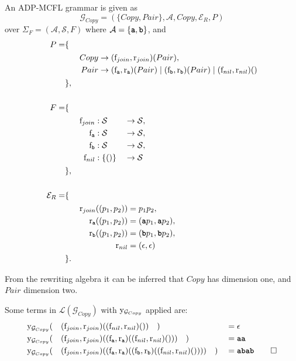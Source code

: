\documentclass[
    a4paper,
    12pt,
    twoside,
    BCOR=12mm,
    parskip=half,
    chapterprefix,
    numbers=noenddot,
    bibliography=totoc
]{scrbook}
\begin{document}
\begin{example}
	\label{ex:adp_mcfl_copylang}
	An ADP-MCFL grammar is given as
	\[ \mathcal{G}_{Copy} = (\{Copy,Pair\},\mathcal{A},Copy,\mathcal{E}_{R},P) \] over $\Sigma_{F}=(\mathcal{A},\mathcal{S},F)$ where $\mathcal{A}=\{\ts{a},\ts{b}\}$, and
	\begin{align*}
		P = &\{&&\\
			&&&\begin{aligned}
          Copy &\to (\op{f}_{join},\op{r}_{join})(Pair), \\
          Pair &\to (\op{f}_\ts{a},\op{r}_\ts{a})(Pair) \mid (\op{f}_\ts{b},\op{r}_\ts{b})(Pair) \mid (\op{f}_{nil},\op{r}_{nil})()
        \end{aligned}\\
		&\},&&\\
    \\
		F = &\{&&\\
		&&&\begin{aligned}
        \op{f}_{join} &: \mathcal{S} &&\to \mathcal{S},\\
        \op{f}_\ts{a} &: \mathcal{S} &&\to \mathcal{S},\\
        \op{f}_\ts{b} &: \mathcal{S} &&\to \mathcal{S},\\
        \op{f}_{nil} &: \{()\} &&\to \mathcal{S}
      \end{aligned}\\
		&\},&&\\
    \\
		\mathcal{E}_{R} = &\{&&\\
		&&&\begin{aligned}
        \op{r}_{join}((p_1,p_2)) &= p_1 p_2,\\
        \op{r}_\ts{a}((p_1,p_2)) &= (\ts{a} p_1, \ts{a} p_2),\\
        \op{r}_\ts{b}((p_1,p_2)) &= (\ts{b} p_1, \ts{b} p_2),\\
        \op{r}_{nil} &= (\epsilon,\epsilon)
      \end{aligned}\\
		&\}.&&
	\end{align*}
	
	From the rewriting algebra it can be inferred that $Copy$ has dimension one, and $Pair$ dimension two.
	
	Some terms in $\mathcal{L}(\mathcal{G}_{Copy})$ with $\mathrm{y}_{\mathcal{G}_{Copy}}$ applied are:
	\begin{align*}
		&\op{y}_{\mathcal{G}_{Copy}}(\quad (\op{f}_{join},\op{r}_{join})((\op{f}_{nil},\op{r}_{nil})()) \quad) &&= \epsilon\\
		&\op{y}_{\mathcal{G}_{Copy}}(\quad (\op{f}_{join},\op{r}_{join})((\op{f}_\ts{a},\op{r}_\ts{a})((\op{f}_{nil},\op{r}_{nil})())) \quad) &&= \ts{aa}\\
		&\op{y}_{\mathcal{G}_{Copy}}(\quad (\op{f}_{join},\op{r}_{join})((\op{f}_\ts{a},\op{r}_\ts{a})((\op{f}_\ts{b},\op{r}_\ts{b})((\op{f}_{nil},\op{r}_{nil})()))) \quad) &&= \ts{abab}	\qedhere\\
	\end{align*}
\end{example}
\end{document}
